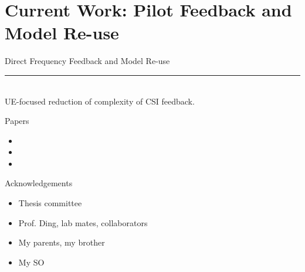\documentclass{beamer}
\begin{document}
\section{Current Work: Pilot Feedback and Model Re-use}

  \begin{frame}[plain]
    \vfill
    \centering
    \begin{beamercolorbox}[sep=8pt,center,shadow=true,rounded=true]{Direct Frequency Feedback and Model Re-use}
      \insertsectionhead\par%
      \color{davisblue}\noindent\rule{10cm}{1pt} \\
      \footnotesize{UE-focused reduction of complexity of CSI feedback.} 
    \end{beamercolorbox}
    \vfill
  \end{frame}



  \begin{frame}{Papers}
    \footnotesize{
    \begin{itemize}
      \item {}
      \item {}
      \item {}
    \end{itemize}
    }
  \end{frame}

  \begin{frame}{Acknowledgements}
    \begin{itemize}
      \item Thesis committee
      \pause
      \item Prof. Ding, lab mates, collaborators
      \pause
      \item My parents, my brother
      \pause
      \item My SO
    \end{itemize}
  \end{frame}
\end{document}

